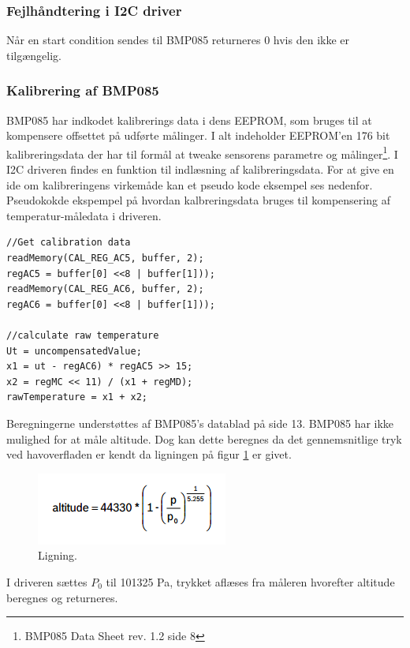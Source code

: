 \subsubsection{Fejlhåndtering i I2C driver}
Når en start condition sendes til BMP085 returneres 0 hvis den ikke er tilgængelig.

\subsubsection{Kalibrering af BMP085}
BMP085 har indkodet kalibrerings data i dens EEPROM, som bruges til at kompensere offsettet på udførte målinger. I alt indeholder EEPROM’en 176 bit kalibreringsdata der har til formål at tweake sensorens parametre og målinger\footnote{BMP085 Data Sheet rev. 1.2 side 8}. I I2C driveren findes en funktion til indlæsning af kalibreringsdata.
For at give en ide om kalibreringens virkemåde kan et pseudo kode eksempel ses nedenfor. 
Pseudokokde ekspempel på hvordan kalbreringsdata bruges til kompensering af temperatur-måledata i driveren.

\begin{lstlisting}
//Get calibration data
readMemory(CAL_REG_AC5, buffer, 2);
regAC5 = buffer[0] <<8 | buffer[1]));
readMemory(CAL_REG_AC6, buffer, 2);
regAC6 = buffer[0] <<8 | buffer[1]));

//calculate raw temperature
Ut = uncompensatedValue;
x1 = ut - regAC6) * regAC5 >> 15;
x2 = regMC << 11) / (x1 + regMD);
rawTemperature = x1 + x2;
\end{lstlisting}

Beregningerne understøttes af BMP085’s datablad på side 13.
BMP085 har ikke mulighed for at måle altitude. Dog kan dette beregnes da det gennemsnitlige tryk ved havoverfladen er kendt da ligningen på figur \ref{fig:equation} er givet.

\begin{figure}[h]
	\centering
	\includegraphics[width=0.45\linewidth]{figs/equation}
	\caption{Ligning.}
	\label{fig:equation}
\end{figure}

I driveren sættes $P_0$ til 101325 Pa, trykket aflæses fra måleren hvorefter altitude beregnes og returneres. 

